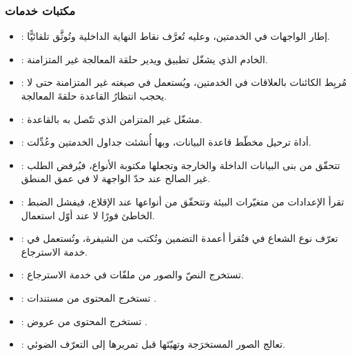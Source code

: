 \subsubsection{مكتبات خدمات }

\begin{itemize}
  \item \textbf{}: إطار الواجهات في الخدمتين، وعليه تُعرَّف نقاط النهاية الداخلية وتُوثَّق تلقائيًّا.

  \item \textbf{}: الخادم الذي يشغّل تطبيق  ويدير حلقة المعالجة غير المتزامنة.

  \item \textbf{}: مُربِط الكائنات بالعلاقات في الخدمتين، ويُستعمل في صيغته غير المتزامنة حتى لا يحجب انتظارُ القاعدة حلقةَ المعالجة.

  \item \textbf{}: مشغّل  غير المتزامن الذي تتّصل به  بالقاعدة.

  \item \textbf{}: أداة ترحيل مخطّط قاعدة البيانات، وبها أُنشئت جداول الخدمتين وعُدِّلت.

  \item \textbf{}: تتحقّق من بنى البيانات الداخلة والخارجة وتجعلها مكتوبة الأنواع، فيُرفض الطلب غير الصالح عند حدّ الواجهة لا في عمق المنطق.

  \item \textbf{}: تقرأ الإعدادات من متغيّرات البيئة وتتحقّق من أنواعها عند الإقلاع، فيفشل الضبط الخاطئ فورًا لا عند أوّل استعمال.

  \item \textbf{}: تعرّف نوع الشعاع في  فتُقرأ أعمدة التضمين وتُكتب من الشيفرة، وتُستعمل في خدمة الاسترجاع.

  \item \textbf{}: تستخرج النصّ والصور من ملفّات  في خدمة الاسترجاع.

  \item \textbf{}: تستخرج المحتوى من مستندات .

  \item \textbf{}: تستخرج المحتوى من عروض .

  \item \textbf{}: تعالج الصور المستخرَجة وتهيّئها قبل تمريرها إلى التعرّف الضوئي.


\end{itemize}
